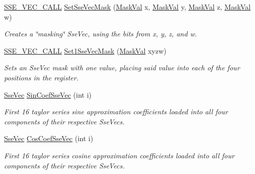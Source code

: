 \begin{DoxyCompactItemize}
\hyperlink{ssevec__math__defs_8h_a97454f977a5281455cecacce1e8ba670}{S\+S\+E\+\_\+\+V\+E\+C\+\_\+\+C\+A\+L\+L} \hyperlink{namespacegfxmath_ae6fdce7b817a9d0caea6a71c5a377bbb}{Set\+Sse\+Vec\+Mask} (\hyperlink{group___scalar_math_consts_gad991473bd51363f9743013730e68751a}{Mask\+Val} x, \hyperlink{group___scalar_math_consts_gad991473bd51363f9743013730e68751a}{Mask\+Val} y, \hyperlink{group___scalar_math_consts_gad991473bd51363f9743013730e68751a}{Mask\+Val} z, \hyperlink{group___scalar_math_consts_gad991473bd51363f9743013730e68751a}{Mask\+Val} w)
\begin{DoxyCompactList}\small\item\em Creates a \char`\"{}masking\char`\"{} Sse\+Vec, using the bits from x, y, z, and w. \end{DoxyCompactList}\item 
\hyperlink{ssevec__math__defs_8h_a97454f977a5281455cecacce1e8ba670}{S\+S\+E\+\_\+\+V\+E\+C\+\_\+\+C\+A\+L\+L} \hyperlink{namespacegfxmath_a6afdd3908c46c824484904fc028bac61}{Set1\+Sse\+Vec\+Mask} (\hyperlink{group___scalar_math_consts_gad991473bd51363f9743013730e68751a}{Mask\+Val} xyzw)
\begin{DoxyCompactList}\small\item\em Sets an Sse\+Vec mask with one value, placing said value into each of the four positions in the register. \end{DoxyCompactList}\item 
\hypertarget{namespacegfxmath_a32beb16d72f4724ce3e826acafa705d3}{}\hyperlink{namespacegfxmath_a0de2243e2b8d0fd46d3af5e036423004}{Sse\+Vec} \hyperlink{namespacegfxmath_a32beb16d72f4724ce3e826acafa705d3}{Sin\+Coef\+Sse\+Vec} (int i)\label{namespacegfxmath_a32beb16d72f4724ce3e826acafa705d3}

\begin{DoxyCompactList}\small\item\em First 16 taylor series sine approximation coefficients loaded into all four components of their respective Sse\+Vecs. \end{DoxyCompactList}\item 
\hypertarget{namespacegfxmath_a6f2aeaccbda129941daa886e40980a92}{}\hyperlink{namespacegfxmath_a0de2243e2b8d0fd46d3af5e036423004}{Sse\+Vec} \hyperlink{namespacegfxmath_a6f2aeaccbda129941daa886e40980a92}{Cos\+Coef\+Sse\+Vec} (int i)\label{namespacegfxmath_a6f2aeaccbda129941daa886e40980a92}

\begin{DoxyCompactList}\small\item\em First 16 taylor series cosine approximation coefficients loaded into all four components of their respective Sse\+Vecs. \end{DoxyCompactList}\end{DoxyCompactItemize}


